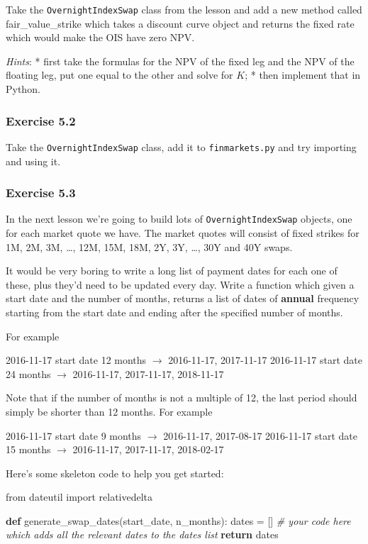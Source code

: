 \documentclass[11pt]{article}
\newenvironment{Shaded}{}{}
\newcommand{\KeywordTok}[1]{\textcolor[rgb]{0.00,0.44,0.13}{\textbf{{#1}}}}
\newcommand{\CommentTok}[1]{\textcolor[rgb]{0.38,0.63,0.69}{\textit{{#1}}}}
\newcommand{\NormalTok}[1]{{#1}}
\newcommand{\ImportTok}[1]{{#1}}
\newcommand{\ControlFlowTok}[1]{\textcolor[rgb]{0.00,0.44,0.13}{\textbf{{#1}}}}
\newcommand{\OperatorTok}[1]{\textcolor[rgb]{0.40,0.40,0.40}{{#1}}}
\begin{document}
Take the \texttt{OvernightIndexSwap} class from the lesson and add a new
method called fair\_value\_strike which takes a discount curve object
and returns the fixed rate which would make the OIS have zero NPV.

\emph{Hints}: * first take the formulas for the NPV of the fixed leg and
the NPV of the floating leg, put one equal to the other and solve for
\(K\); * then implement that in Python.

\hypertarget{exercise-5.2}{%
\subsubsection{Exercise 5.2}\label{exercise-5.2}}

Take the \texttt{OvernightIndexSwap} class, add it to
\texttt{finmarkets.py} and try importing and using it.

\hypertarget{exercise-5.3}{%
\subsubsection{Exercise 5.3}\label{exercise-5.3}}

In the next lesson we're going to build lots of
\texttt{OvernightIndexSwap} objects, one for each market quote we have.
The market quotes will consist of fixed strikes for 1M, 2M, 3M,
\ldots{}, 12M, 15M, 18M, 2Y, 3Y, \ldots{}, 30Y and 40Y swaps.

It would be very boring to write a long list of payment dates for each
one of these, plus they'd need to be updated every day. Write a function
which given a start date and the number of months, returns a list of
dates of \textbf{annual} frequency starting from the start date and
ending after the specified number of months.

For example

2016-11-17 start date 12 months \(\rightarrow\) 2016-11-17, 2017-11-17
2016-11-17 start date 24 months \(\rightarrow\) 2016-11-17, 2017-11-17,
2018-11-17

Note that if the number of months is not a multiple of 12, the last
period should simply be shorter than 12 months. For example

2016-11-17 start date 9 months \(\rightarrow\) 2016-11-17, 2017-08-17
2016-11-17 start date 15 months \(\rightarrow\) 2016-11-17, 2017-11-17,
2018-02-17

Here's some skeleton code to help you get started:

\begin{Shaded}
\begin{Highlighting}[]
\ImportTok{from}\NormalTok{ dateutil }\ImportTok{import}\NormalTok{ relativedelta}

\KeywordTok{def}\NormalTok{ generate_swap_dates(start_date, n_months):}
\NormalTok{    dates }\OperatorTok{=}\NormalTok{ []}
    \CommentTok{# your code here which adds all the relevant dates to the dates list}
    \ControlFlowTok{return}\NormalTok{ dates}
\end{Highlighting}
\end{Shaded}
\end{document}
